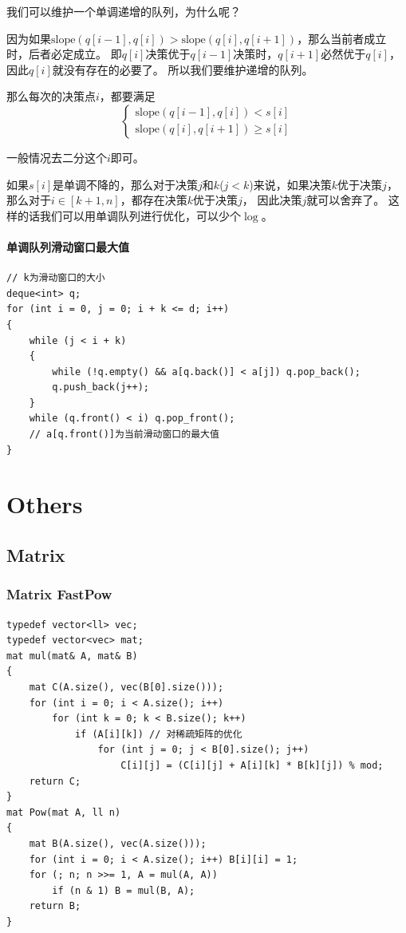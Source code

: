 \documentclass[twoside]{article}
\begin{document}
我们可以维护一个单调递增的队列，为什么呢？

因为如果$\text{slope}(q[i-1],q[i]) > \text{slope}(q[i],q[i+1])$，那么当前者成立时，后者必定成立。 即$q[i]$决策优于$q[i-1]$决策时，$q[i+1]$必然优于$q[i]$，因此$q[i]$就没有存在的必要了。 所以我们要维护递增的队列。

那么每次的决策点$i$，都要满足
$$\begin{cases}
    \text{slope}(q[i-1],q[i]) < s[i] \\
    \text{slope}(q[i],q[i+1]) \ge s[i]
\end{cases}$$

一般情况去二分这个$i$即可。

如果$s[i]$是单调不降的，那么对于决策$j$和$k$($j < k$)来说，如果决策$k$优于决策$j$，那么对于$i \in [k+1,n]$，都存在决策$k$优于决策$j$， 因此决策$j$就可以舍弃了。 这样的话我们可以用单调队列进行优化，可以少个$\log$。

\paragraph{单调队列滑动窗口最大值}
\begin{lstlisting}
// k为滑动窗口的大小
deque<int> q;
for (int i = 0, j = 0; i + k <= d; i++)
{
    while (j < i + k)
    {
        while (!q.empty() && a[q.back()] < a[j]) q.pop_back();
        q.push_back(j++);
    }
    while (q.front() < i) q.pop_front();
    // a[q.front()]为当前滑动窗口的最大值
}
\end{lstlisting}\clearpage\section{Others}
\subsection{Matrix}
\subsubsection{Matrix FastPow}
\begin{lstlisting}
typedef vector<ll> vec;
typedef vector<vec> mat;
mat mul(mat& A, mat& B)
{
    mat C(A.size(), vec(B[0].size()));
    for (int i = 0; i < A.size(); i++)
        for (int k = 0; k < B.size(); k++)
            if (A[i][k]) // 对稀疏矩阵的优化
                for (int j = 0; j < B[0].size(); j++)
                    C[i][j] = (C[i][j] + A[i][k] * B[k][j]) % mod;
    return C;
}
mat Pow(mat A, ll n)
{
    mat B(A.size(), vec(A.size()));
    for (int i = 0; i < A.size(); i++) B[i][i] = 1;
    for (; n; n >>= 1, A = mul(A, A))
        if (n & 1) B = mul(B, A);
    return B;
}
\end{lstlisting}
\end{document}
